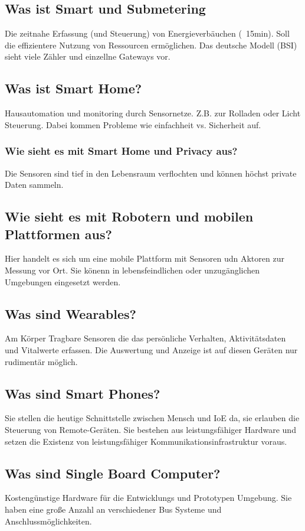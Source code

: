 	\subsection{Was ist Smart\- und Submetering}
	Die zeitnahe Erfassung (und Steuerung) von Energieverbäuchen (~15min). Soll die effizientere Nutzung von Ressourcen ermöglichen. Das deutsche Modell (BSI) sieht viele Zähler und einzellne Gateways vor. 
	
	\subsection{Was ist Smart Home?}
	Hausautomation und monitoring durch Sensornetze. 
	Z.B. zur Rolladen oder Licht Steuerung.
	Dabei kommen Probleme wie einfachheit vs. Sicherheit auf. 
	\subsubsection{Wie sieht es mit Smart Home und Privacy aus?}
	Die Sensoren sind tief in den Lebensraum verflochten und können höchst private Daten sammeln.
	\subsection{Wie sieht es mit Robotern und mobilen Plattformen aus?}
	Hier handelt es sich um eine mobile Plattform mit Sensoren udn Aktoren zur Messung vor Ort.
	Sie könenn in lebensfeindlichen oder unzugänglichen Umgebungen eingesetzt werden.
	\subsection{Was sind Wearables?}
	Am Körper Tragbare Sensoren die das persönliche Verhalten, Aktivitätsdaten und Vitalwerte erfassen.
	Die Auswertung und Anzeige ist auf diesen Geräten nur rudimentär möglich.
	\subsection{Was sind Smart Phones?}
	Sie stellen die heutige Schnittstelle zwischen Mensch und IoE da, sie erlauben die Steuerung von Remote-Geräten.
	Sie bestehen aus leistungsfähiger Hardware und setzen die Existenz von leistungsfähiger Kommunikationsinfrastruktur voraus.
	\subsection{Was sind Single\- Board Computer?}
	Kostengünstige Hardware für die Entwicklungs und Prototypen Umgebung.
	Sie haben eine große Anzahl an verschiedener Bus Systeme und Anschlussmöglichkeiten.
	
